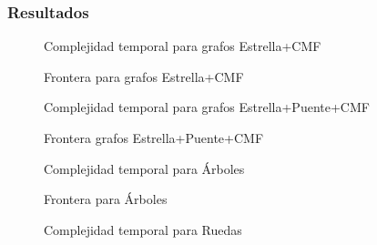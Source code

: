 \subsubsection{Resultados}

\begin{figure}[H]
    \centering
    \fontsize{7}{10}\selectfont
    \resizebox{0.87\textwidth}{!}{}
    \caption{Complejidad temporal para grafos Estrella+CMF}
\end{figure}

\begin{figure}[H]
    \centering
    \fontsize{7}{10}\selectfont
    \resizebox{0.87\textwidth}{!}{}
    \caption{Frontera para grafos Estrella+CMF}
\end{figure}

\begin{figure}[H]
    \centering
    \fontsize{7}{10}\selectfont
    \resizebox{0.87\textwidth}{!}{}
    \caption{Complejidad temporal para grafos Estrella+Puente+CMF}
\end{figure}

\begin{figure}[H]
    \centering
    \fontsize{7}{10}\selectfont
    \resizebox{0.87\textwidth}{!}{}
    \caption{Frontera grafos Estrella+Puente+CMF}
\end{figure}

\begin{figure}[H]
    \centering
    \fontsize{7}{10}\selectfont
    \resizebox{0.87\textwidth}{!}{}
    \caption{Complejidad temporal para \'Arboles}
\end{figure}

\begin{figure}[H]
    \centering
    \fontsize{7}{10}\selectfont
    \resizebox{0.87\textwidth}{!}{}
    \caption{Frontera para \'Arboles}
\end{figure}


\begin{figure}[H]
    \centering
    \fontsize{7}{10}\selectfont
    \resizebox{0.87\textwidth}{!}{}
    \caption{Complejidad temporal para Ruedas}
\end{figure}

